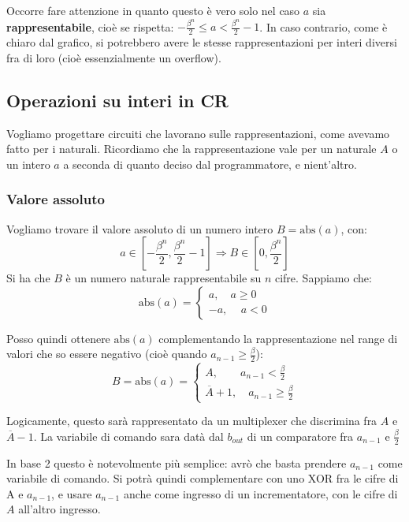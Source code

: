 \documentclass[a4paper,11pt]{article}
\begin{document}
Occorre fare attenzione in quanto questo è vero solo nel caso $a$ sia \textbf{rappresentabile}, cioè se rispetta: $ -\frac{\beta^n}{2} \leq a < \frac{\beta^n}{2} - 1 $. 
In caso contrario, come è chiaro dal grafico, si potrebbero avere le stesse rappresentazioni per interi diversi fra di loro (cioè essenzialmente un overflow).

\subsection{Operazioni su interi in CR}
Vogliamo progettare circuiti che lavorano sulle rappresentazioni, come avevamo fatto per i naturali.
Ricordiamo che la rappresentazione vale per un naturale $A$ o un intero $a$ a seconda di quanto deciso dal programmatore, e nient'altro.

\subsubsection{Valore assoluto}
Vogliamo trovare il valore assoluto di un numero intero $B = \mathrm{abs}(a)$, con: 
$$ a \in \left[ -\frac{\beta^n}{2}, \frac{\beta^n}{2} - 1 \right] \Rightarrow B \in \left[0, \frac{\beta^n}{2}\right]
$$
Si ha che $B$ è un numero naturale rappresentabile su $n$ cifre.
Sappiamo che:
\[
	\mathrm{abs}(a) =
	\begin{cases}
			a, \quad a \geq 0 \\ 
			-a, \quad \, a < 0 
	\end{cases}
\] 

Posso quindi ottenere $\mathrm{abs}(a)$ complementando la rappresentazione nel range di valori che so essere negativo (cioè quando $a_{n-1} \geq \frac{\beta}{2}$):
\[
	B = \mathrm{abs}(a) =
	\begin{cases}
		A, \quad \quad a_{n-1} < \frac{\beta}{2} \\ 
		\overline{A} +  1, \quad a_{n-1} \geq \frac{\beta}{2}
	\end{cases}
\]

Logicamente, questo sarà rappresentato da un multiplexer che discrimina fra $A$ e $\overline{A} - 1$.
La variabile di comando sara datà dal $b_{out}$ di un comparatore fra $a_{n-1}$ e $\frac{\beta}{2}$

In base 2 questo è notevolmente più semplice: avrò che basta prendere $a_{n-1}$ come variabile di comando.
Si potrà quindi complementare con uno XOR fra le cifre di A e $a_{n-1}$, e usare $a_{n-1}$ anche come ingresso di un incrementatore, con le cifre di $A$ all'altro ingresso.
\end{document}

